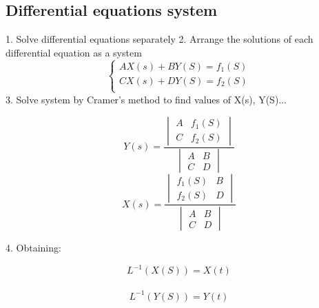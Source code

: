 \documentclass[letterpaper]{article}
\begin{document}
    \begin{multicols}{2}
        \section{Differential equations system}
            1. Solve differential equations separately
            2. Arrange the solutions of each differential equation as a system
            \[ 
                \begin{cases} 
				AX(s) + BY(S) = f_1(S)\\
                CX(s) + DY(S)  = f_2(S)\\
			\end{cases}
            \]
            3. Solve system by Cramer's method to find values of X(s), Y(S)...
            
            \[Y(s) = \frac{
            \begin{vmatrix}
                A & f_1(S)\\
                C & f_2(S)
            \end{vmatrix}}
            {
            \begin{vmatrix}
                A & B\\
                C & D
            \end{vmatrix}
            }\]
            \[X(s) = \frac{
            \begin{vmatrix}
                f_1(S) & B\\
                f_2(S) & D
            \end{vmatrix}}
            {
            \begin{vmatrix}
                A & B\\
                C & D
            \end{vmatrix}
            }\]

            4. Obtaining:
            
             \[{L}^{-1} (X(S)) = X(t)\]  \\
             \[{L}^{-1} (Y(S)) = Y(t) \]
                    
    \end{multicols}
\end{document}
